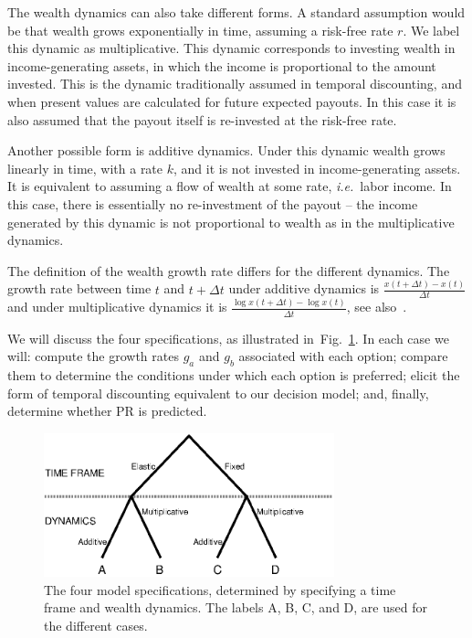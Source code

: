 \documentclass[11pt]{article}
\newcommand{\ie}{{\it i.e.}\ }
\newcommand{\flabel}[1]{\label{fig:#1}}
\newcommand{\fref}[1]{Fig.~\ref{fig:#1}}
\newcommand{\Dt}{\Delta t}
\numberwithin{equation}{section}
\begin{document}
The wealth dynamics can also take different forms. A standard assumption would be that wealth grows exponentially in time, assuming a risk-free rate $r$. We label this dynamic as multiplicative. This dynamic corresponds to investing wealth in income-generating assets, in which the income is proportional to the amount invested. This is the dynamic traditionally assumed in temporal discounting, and when present values are calculated for future expected payouts. In this case it is also assumed that the payout itself is re-invested at the risk-free rate.

Another possible form is additive dynamics. Under this dynamic wealth grows linearly in time, with a rate $k$, and it is not invested in income-generating assets. It is equivalent to assuming a flow of wealth at some rate, \ie labor income. In this case, there is essentially no re-investment of the payout -- the income generated by this dynamic is not proportional to wealth as in the multiplicative dynamics.

The definition of the wealth growth rate differs for the different dynamics. The growth rate between time $t$ and $t+\Dt$ under additive dynamics is $\frac{x\left(t+\Dt\right)-x\left(t\right)}{\Dt}$ and under multiplicative dynamics it is $\frac{\log x(t+\Dt)-\log x(t)}{\Dt}$, see also~\citep{peters2016evaluating,peters2018time}.

We will discuss the four specifications, as illustrated in~\fref{tree}. In each case we will: compute the growth rates $g_a$ and $g_b$ associated with each option; compare them to determine the conditions under which each option is preferred; elicit the form of temporal discounting equivalent to our decision model; and, finally, determine whether PR is predicted.

\begin{figure}[!htb]
\centering
\includegraphics[width=0.75\textwidth]{./figures/tree.eps}
\caption{The four model specifications, determined by specifying a time frame and wealth dynamics. The labels A, B, C, and D, are used for the different cases.}
\flabel{tree}
\end{figure}
\end{document}
